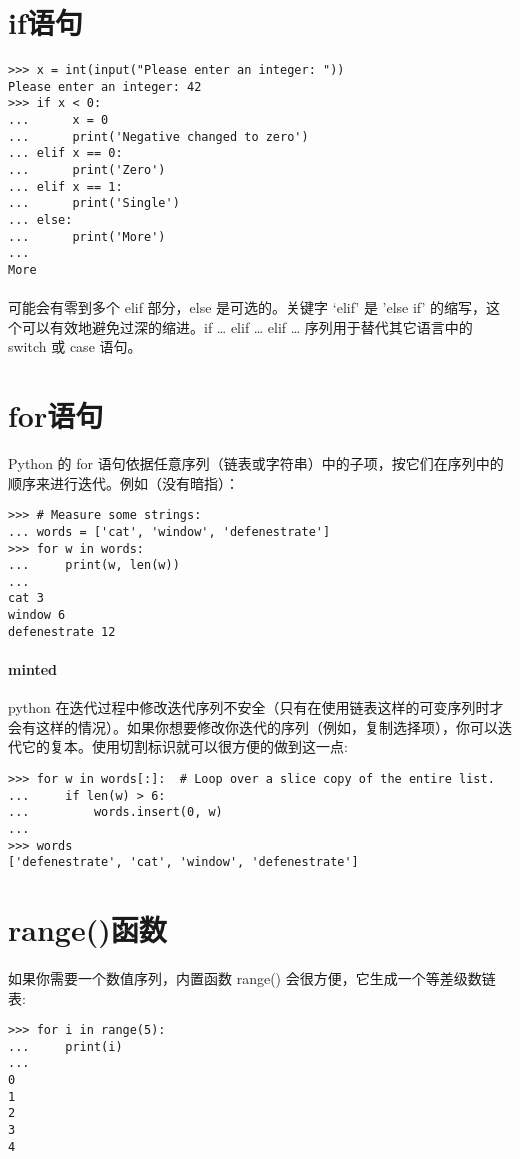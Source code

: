 \documentclass{article}
\begin{document}
\begin{CJK}{UTF8}{gbsn}
\section{if语句}
\paragraph{}
\begin{verbatim}
>>> x = int(input("Please enter an integer: "))
Please enter an integer: 42
>>> if x < 0:
...      x = 0
...      print('Negative changed to zero')
... elif x == 0:
...      print('Zero')
... elif x == 1:
...      print('Single')
... else:
...      print('More')
...
More
\end{verbatim}
\paragraph{}
可能会有零到多个 elif 部分，else 是可选的。关键字 ‘elif’ 是 ’else if’ 的缩写，这个可以有效地避免过深的缩进。if … elif … elif … 序列用于替代其它语言中的 switch 或 case 语句。
\section{for语句}
Python 的 for 语句依据任意序列（链表或字符串）中的子项，按它们在序列中的顺序来进行迭代。例如（没有暗指）：
\begin{verbatim}
>>> # Measure some strings:
... words = ['cat', 'window', 'defenestrate']
>>> for w in words:
...     print(w, len(w))
...
cat 3
window 6
defenestrate 12
\end{verbatim}
\paragraph{minted}{python}
在迭代过程中修改迭代序列不安全（只有在使用链表这样的可变序列时才会有这样的情况）。如果你想要修改你迭代的序列（例如，复制选择项），你可以迭代它的复本。使用切割标识就可以很方便的做到这一点:
\begin{verbatim}
>>> for w in words[:]:  # Loop over a slice copy of the entire list.
...     if len(w) > 6:
...         words.insert(0, w)
...
>>> words
['defenestrate', 'cat', 'window', 'defenestrate']
\end{verbatim}
\section{range()函数}
\paragraph{}
如果你需要一个数值序列，内置函数 range() 会很方便，它生成一个等差级数链表:
\begin{verbatim}
>>> for i in range(5):
...     print(i)
...
0
1
2
3
4
\end{verbatim}

\end{CJK}
\end{document}

